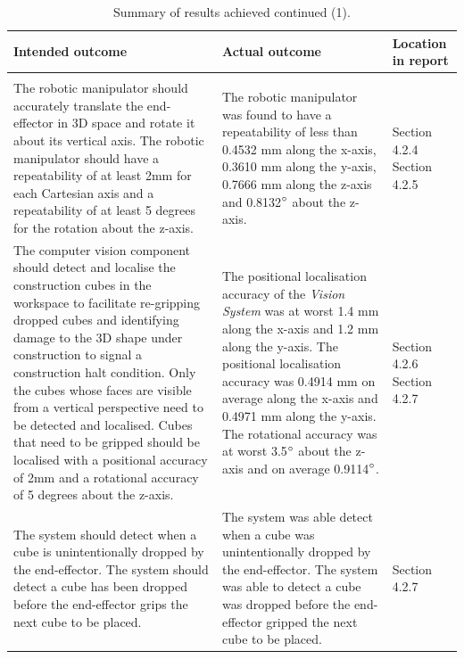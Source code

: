 \begin{table}[H]
	\renewcommand{\arraystretch}{1.3}
	\centering
	\begin{tabular}{|>{\raggedright}m{6cm}|>{\raggedright}m{6cm}|>{\raggedright\arraybackslash}m{2.2cm}|}
		\hline
		\textbf{Intended outcome} & \textbf{Actual outcome} & \textbf{Location in report} \\
		\hline
		\multicolumn{3}{|l|}{\textbf{Core mission requirements and specifications}} \\
		\hline
		The robotic manipulator should accurately translate the end-effector in 3D space and rotate it about its vertical axis. The robotic manipulator should have a repeatability of at least 2mm for each Cartesian axis and a repeatability of at least 5 degrees for the rotation about the z-axis. & The robotic manipulator was found to have a repeatability of less than 0.4532 mm along the x-axis, 0.3610 mm along the y-axis, 0.7666 mm along the z-axis and 0.8132$^{\circ}$ about the z-axis. & Section 4.2.4 Section 4.2.5 \\
		\hline
		The computer vision component should detect and localise the construction cubes in the workspace to facilitate re-gripping dropped cubes and identifying damage to the 3D shape under construction to signal a construction halt condition. Only the cubes whose faces are visible from a vertical perspective need to be detected and localised. Cubes that need to be gripped should be localised with a positional accuracy of 2mm and a rotational accuracy of 5 degrees about the z-axis. & The positional localisation accuracy of the \textit{Vision System} was at worst 1.4 mm along the x-axis and 1.2 mm along the y-axis. The positional localisation accuracy was 0.4914 mm on average along the x-axis and 0.4971 mm along the y-axis. The rotational accuracy was at worst 3.5$^{\circ}$ about the z-axis and on average 0.9114$^{\circ}$. & Section 4.2.6 Section 4.2.7 \\
		\hline
		The system should detect when a cube is unintentionally dropped by the end-effector. The system should detect a cube has been dropped before the end-effector grips the next cube to be placed. & The system was able detect when a cube was unintentionally dropped by the end-effector. The system was able to detect a cube was dropped before the end-effector gripped the next cube to be placed. & Section 4.2.7 \\
		\hline
	\end{tabular}
	\caption{\label{tab:results_summary_p2}Summary of results achieved continued (1).}
\end{table}

